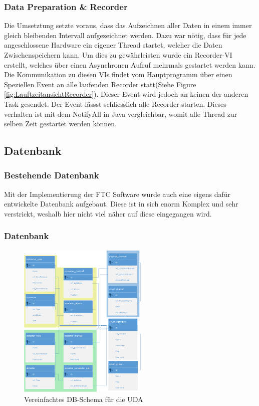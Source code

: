 \documentclass[10pt]{scrartcl}
\begin{document}
\subsubsection{Data Preparation \& Recorder}
Die Umsetztung setzte voraus, dass das Aufzeichnen aller Daten in einem immer gleich bleibenden Intervall aufgezeichnet werden. Dazu war nötig, dass für jede angeschlossene Hardware ein eigener Thread startet, welcher die Daten Zwischenspeichern kann. Um dies zu gewährleisten wurde ein Recorder-\gls{VI} erstellt, welches über einen Asynchronen Aufruf mehrmals gestartet werden kann. Die Kommunikation zu diesen \gls{VI}s findet vom Hauptprogramm über einen Speziellen Event an alle laufenden Recorder statt(Siehe Figure \ref{fig:LauftzeitansichtRecorder}). Dieser Event wird jedoch an keinen der anderen Task gesendet. Der Event lässst schliesslich alle Recorder starten. Dieses verhalten ist mit dem NotifyAll in Java vergleichbar, womit alle Thread zur selben Zeit gestartet werden können. 

\subsection{Datenbank}
\subsubsection{Bestehende Datenbank}
Mit der Implementierung der FTC Software wurde auch eine eigens dafür entwickelte Datenbank aufgebaut. Diese ist in sich enorm Komplex und sehr verstrickt, weshalb hier nicht viel näher auf diese eingegangen wird.
\subsubsection{Datenbank}
\begin{figure}
	\begin{center}
		\includegraphics[width=0.55\textwidth]{DBShemaEasy2.png}
		\caption{Vereinfachtes DB-Schema für die UDA}
		\label{fig:DBSchemaUDA}
	\end{center}
\end{figure}
\end{document}
